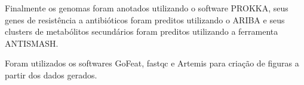 Finalmente os genomas foram anotados utilizando o software
PROKKA, seus genes de resistência a antibióticos foram preditos utilizando o ARIBA e seus clusters de metabólitos
secundários foram preditos utilizando a ferramenta ANTISMASH.

Foram utilizados os softwares GoFeat, fastqc e Artemis para criação de figuras a partir dos dados gerados.
